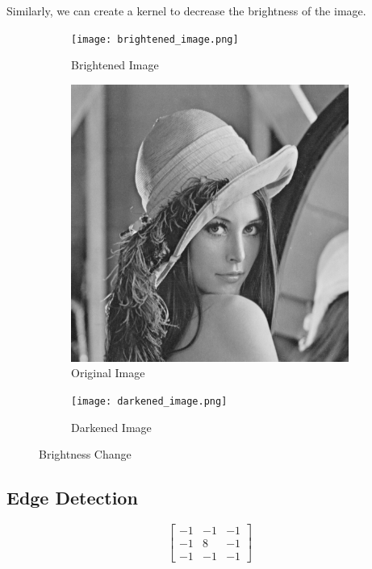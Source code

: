 \documentclass[12pt]{report}
\begin{document}
Similarly, we can create a kernel to decrease the brightness of the image.

\begin{figure}[H]
    \centering
    \begin{subfigure}{0.3\textwidth}
        \centering
        \texttt{[image: brightened\_image.png]}
        \caption{Brightened Image}
        \label{fig:f2}
    \end{subfigure}
    \begin{subfigure}{0.3\textwidth}
        \centering
        \includegraphics[width=\linewidth]{Lena.png}
        \caption{Original Image}
        \label{fig:f1}
    \end{subfigure}
    \begin{subfigure}{0.3\textwidth}
        \centering
        \texttt{[image: darkened\_image.png]}
        \caption{Darkened Image}
        \label{fig:f3}
    \end{subfigure}
    \caption{Brightness Change}
\end{figure}

\subsection{Edge Detection}

\begin{equation*}
    \begin{bmatrix}
        -1 & -1 & -1 \\
        -1 & 8  & -1 \\
        -1 & -1 & -1
    \end{bmatrix}
\end{equation*}
\end{document}
